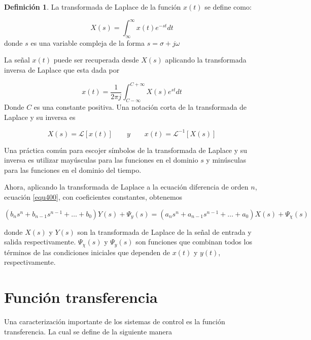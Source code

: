 \documentclass[12pt]{book}
\theoremstyle{definition}
\newtheorem{dfn}{Definición}[section]
\theoremstyle{remark}
\theoremstyle{plain}
\begin{document}
\begin{dfn}
\label{def401}
La transformada de Laplace de la función $x(t)$ se define como:

\begin{equation}
\label{equ401}
 X(s)=\int_{\infty}^{\infty} x(t) e^{-s t}dt
\end{equation}
donde $s$ es una variable compleja de la forma $s=\sigma +j \omega$
\end{dfn}


La señal $x(t)$ puede ser recuperada desde $X(s)$ aplicando la transformada inversa de Laplace que esta dada por

\begin{equation}
\label{equ402}
 x(t)=\frac{1}{2 \pi j} \int_{C-\infty}^{C+\infty} X(s) e^{s t}dt
\end{equation}
Donde $C$ es una constante positiva. Una notación corta de la transformada de Laplace y su inversa es

\begin{displaymath}
X(s) = \mathcal{L} [x(t)] \qquad y \qquad x(t)= \mathcal{L} ^{-1}[ X(s)]
\end{displaymath}

Una práctica común para escojer símbolos de la transformada de Laplace y su inversa es utilizar mayúsculas para las funciones en el dominio $s$ y minúsculas para las funciones en el dominio del tiempo.

Ahora, aplicando la transformada de Laplace a la ecuación diferencia de orden $n$, ecuación \ref{equ400}, con coeficientes constantes, obtenemos

\begin{equation}
\label{equ403}
 (b_n s^n+b_{n-1} s^{n-1}+ \dotsc  + b_0) Y(s)+ \Psi _{y} (s)=(a_n s^n +a_{n-1} s^{n-1} + \dotsc + a_0)X(s)+ \Psi _{\chi} (s)
\end{equation}

donde
$X(s)$ y $Y(s)$ son la transformada de Laplace de la señal de entrada y salida respectivamente.
$ \Psi _{\chi} (s)$ y $\Psi _{y} (s)$ son funciones que combinan todos los términos de las  condiciones iniciales que dependen de $x(t)$ y $y(t)$, respectivamente.

\section{Función transferencia}
Una caracterización importante de los sistemas de control es la función transferencia. La cual se define de la siguiente manera
\end{document}
